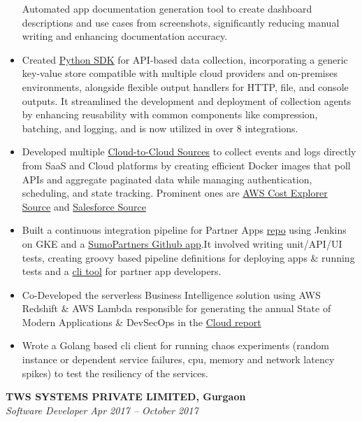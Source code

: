 \documentclass[margin,line]{resume}
\begin{document}
\begin{resume}
\begin{itemize}
                \subitem Automated app documentation generation tool to create dashboard descriptions and use cases from screenshots, significantly reducing manual writing and enhancing documentation accuracy.
            \item Created \href{https://pypi.org/project/sumologic-appclient-sdk/}{Python SDK} for API-based data collection, incorporating a generic key-value store compatible with multiple cloud providers and on-premises environments, alongside flexible output handlers for HTTP, file, and console outputs. It streamlined the development and deployment of collection agents by enhancing reusability with common components like compression, batching, and logging, and is now utilized in over 8 integrations.
            \item Developed multiple \href{https://help.sumologic.com/docs/send-data/hosted-collectors/cloud-to-cloud-integration-framework/}{Cloud-to-Cloud Sources} to collect events and logs directly from SaaS and Cloud platforms by creating efficient Docker images that poll APIs and aggregate paginated data while managing authentication, scheduling, and state tracking. Prominent ones are
             \href{https://help.sumologic.com/docs/send-data/hosted-collectors/cloud-to-cloud-integration-framework/aws-cost-explorer-source/}{AWS Cost Explorer Source} and \href{https://help.sumologic.com/docs/send-data/hosted-collectors/cloud-to-cloud-integration-framework/salesforce-source/}{Salesforce Source}
            \item Built a continuous integration pipeline for Partner Apps \href{https://github.com/SumoLogic/sumologic-public-partner-apps}{repo} using Jenkins on GKE and a \href{https://github.com/apps/sumopartners}{SumoPartners Github app}.It involved writing unit/API/UI tests, creating groovy based pipeline definitions for deploying apps \& running tests and a \href{https://pypi.org/project/sumologic-apptestutils/}{cli tool} for partner app developers.
            \item Co-Developed the serverless Business Intelligence solution  using AWS Redshift \& AWS Lambda responsible for generating the annual State of Modern Applications \& DevSecOps in the \href{https://www.sumologic.com/brief/state-modern-apps-report/}{Cloud report}
            \item Wrote a Golang based cli client for running chaos experiments (random instance or dependent service failures, cpu, memory and network latency spikes) to test the resiliency of the services.
        \end{itemize}
    \textbf{TWS SYSTEMS PRIVATE LIMITED, Gurgaon}\\
           \textsl{Software Developer} \hfill \textsl{Apr 2017 -- October 2017} \vspace{1mm}%
    \begin{itemize}


\end{itemize}
\end{resume}
\end{document}

